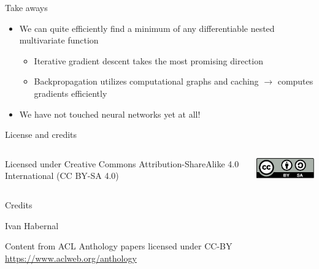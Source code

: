 \documentclass[12pt,aspectratio=169,handout]{beamer}
\begin{document}
\begin{frame}{Take aways}
	
	\begin{itemize}
		
		\item We can quite efficiently find a minimum of any differentiable nested multivariate function
		\begin{itemize}
			\item Iterative gradient descent takes the most promising direction
			\item Backpropagation utilizes computational graphs and caching $\to$ computes gradients efficiently
		\end{itemize}
		\item We have not touched neural networks yet at all!
	\end{itemize}
	
\end{frame}



\begin{frame}{License and credits}
	
	\begin{columns}
		\begin{column}{0.7\textwidth}
			Licensed under Creative Commons Attribution-ShareAlike 4.0 International (CC BY-SA 4.0)
		\end{column}
		\begin{column}{0.2\textwidth}
			\includegraphics[width=0.9\linewidth]{img/cc-by-sa-icon.pdf}
		\end{column}
	\end{columns}
	
	\bigskip
	
	Credits
	
	\begin{scriptsize}
		
		Ivan Habernal
		
		Content from ACL Anthology papers licensed under CC-BY \url{https://www.aclweb.org/anthology}
		
	\end{scriptsize}
	
\end{frame}
\end{document}
